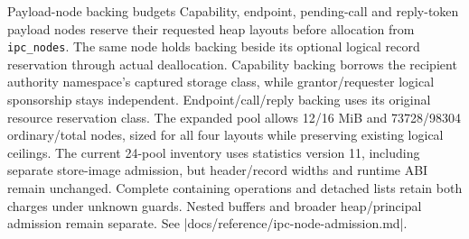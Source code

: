 \begin{implementationdetail}{Payload-node backing budgets}
Capability, endpoint, pending-call and reply-token payload nodes reserve their
requested heap layouts before allocation from \texttt{ipc\_nodes}. The same node
holds backing beside its optional logical record reservation through actual
deallocation. Capability backing borrows the recipient authority namespace's
captured storage class, while grantor/requester logical sponsorship stays independent.
Endpoint/call/reply backing uses its original resource reservation class.
The expanded pool allows 12/16 MiB and 73728/98304 ordinary/total nodes, sized for
all four layouts while preserving existing logical ceilings. The current
24-pool inventory uses statistics version 11, including separate store-image
admission, but header/record widths and runtime ABI remain unchanged. Complete containing
operations and detached lists retain both charges under unknown guards. Nested
buffers and broader heap/principal admission remain separate. See
\repofile|docs/reference/ipc-node-admission.md|.
\end{implementationdetail}


